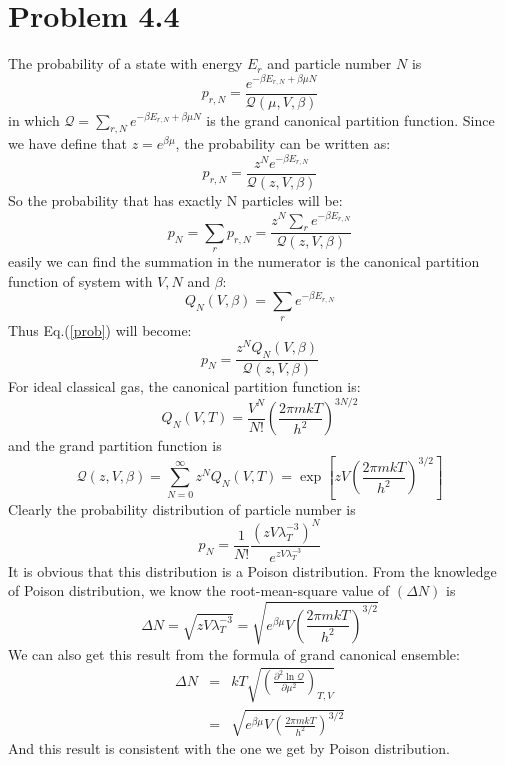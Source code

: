 \documentclass{article}
\begin{document}
\section*{Problem 4.4}
The probability of a state with energy $E_r$ and particle number $N$ is
\begin{equation}
p_{r,N} = \frac{e^{-\beta E_{r,N}+\beta \mu N}}{\mathcal{Q}(\mu,V,\beta)}
\end{equation}
in which $\mathcal{Q} = \sum_{r,N}e^{-\beta E_{r,N}+\beta \mu N}$ is the grand canonical partition function. Since we have define that $z = e^{\beta\mu}$, the probability can be written as:
\begin{equation}
p_{r,N} = \frac{z^N e^{-\beta E_{r,N}}}{\mathcal{Q}(z,V,\beta)}
\end{equation}
So the probability that has exactly N particles will be:
\begin{equation}\label{prob}
p_N = \sum_r p_{r,N} = \frac{z^N\sum_{r}e^{-\beta E_{r,N}}}{\mathcal{Q}(z,V,\beta)}
\end{equation}
easily we can find the summation in the numerator is the canonical partition function of system with $V,N$ and $\beta$:
\begin{equation}
Q_N(V,\beta) = \sum_{r}e^{-\beta E_{r,N}}
\end{equation}
Thus Eq.(\ref{prob}) will become: 
\begin{equation}
p_N = \frac{z^N Q_N(V,\beta)}{\mathcal{Q}(z,V,\beta)}
\end{equation}
For ideal classical gas, the canonical partition function is:
\begin{equation}
Q_N(V,T) = \frac{V^N}{N!}\left(\frac{2\pi mkT}{h^2}\right)^{3N/2}
\end{equation}
and the grand partition function is
\begin{equation}
\mathcal{Q}(z,V,\beta) = \sum_{N = 0}^\infty z^N Q_N(V,T) = \exp\left[zV\left(\frac{2\pi mkT}{h^2}\right)^{3/2}\right]
\end{equation}
Clearly the probability distribution of particle number is
\begin{equation}
p_N = \frac{1}{N!}\frac{(zV\lambda_T^{-3})^N}{e^{zV\lambda_T^{-3}}}
\end{equation}
It is obvious that this distribution is a Poison distribution. From the knowledge of Poison distribution, we know the root-mean-square value of $(\Delta N)$ is
\begin{equation}
\Delta N = \sqrt{zV\lambda_T^{-3}}=\sqrt{e^{\beta\mu}V\left(\frac{2\pi mkT}{h^2}\right)^{3/2}}
\end{equation}
We can also get this result from the formula of grand canonical ensemble:
\begin{eqnarray}
\Delta N &=&kT\sqrt{ \left(\frac{\partial^2 \ln\mathcal{Q}}{\partial\mu^2}\right)_{T,V}}\nonumber\\
&=&\sqrt{e^{\beta\mu}V\left(\frac{2\pi mkT}{h^2}\right)^{3/2}}
\end{eqnarray}
And this result is consistent with the one we get by Poison distribution.
\end{document}
